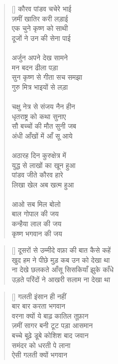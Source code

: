 \begin{verse}[\versewidth]\texthindi{
कौरव पांडव चचेरे भाई\\
ज़मीं खातिर करी लड़ाई\\
एक चुने कृष्ण को साथी\\
दूजों ने उन की सेना पाई\\
\\
अर्जुन अपने देख सामने\\
मन बदन ढीला पड़ा\\
सुन कृष्ण से गीता सच समझा\\
गुरु मित्र भाइयों से लड़ा\\
\\
चक्षु नेत्र से संजय नैन हीन\\
धृतराष्ट्र को कथा सुनाए\\
सौ बच्चों की मौत सुनी जब\\
अंधी आँखों में आँ सू आये\\
\\
अठारह दिन कुरुक्षेत्र में\\
युद्ध से लाखों का खून हुआ\\
पांडव जीते कौरव हारे\\
लिखा खेल अब खत्म हुआ\\
\\
आओ सब मिल बोलो\\
बाल गोपाल की जय\\
कन्हैया लाल की जय\\
कृष्ण भगवान की जय
}\end{verse}

\begin{verse}[\versewidth]\texthindi{
दूसरों से उम्मीदे वफ़ा की बात कैसे कहें\\
खुद हम ने पीछे मुड़ कब उन को देखा था\\
ना देखे छलकते आँसू सिसकियाँ झुके काँधे\\
उड़ते परिंदों ने आखरी सलाम ना देखा था
}\end{verse}

\begin{verse}[\versewidth]\texthindi{
गलती इंसान ही नहीं\\
बार बार करता भगवान\\
वरना क्यों ये बाढ़ कातिल तूफ़ान\\
ज़मीं सागर बनी टूट पड़ा आसमान\\
बच्चे बूढ़े डूबे कोशिश बाद जवान\\
समंदर को धरती पे लाना\\
ऐसी गलती क्यों भगवान
}\end{verse}

